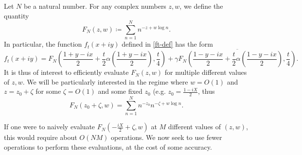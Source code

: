 Let $N$ be a natural number.  For any complex numbers $z,w$, we define the quantity
$$ F_N(z,w) \coloneqq \sum_{n=1}^N  n^{-z + w \log n}.$$
In particular, the function $f_t(x+iy)$ defined in \eqref{ft-def} has the form
$$ f_t(x+iy) = F_N\left( \frac{1+y-ix}{2} + \frac{t}{2} \alpha(\frac{1+y-ix}{2}), \frac{t}{4} \right) + \gamma \overline{F_N\left( \frac{1-y-ix}{2} + \frac{t}{2} \alpha(\frac{1-y-ix}{2}), \frac{t}{4} \right)}.$$
It is thus of interest to efficiently evaluate $F_N(z,w)$ for multiple different values of $z,w$.  We will be particularly interested in the regime where $w=O(1)$ and $z = z_0 + \zeta$ for some $\zeta = O(1)$ and some fixed $z_0$ (e.g. $z_0 = \frac{1-iX}{2}$, thus
$$F_N(z_0+\zeta, w) = \sum_{n=1}^N n^{-z_0} n^{-\zeta + w \log n}.$$

If one were to naively evaluate $F_N(-\frac{iX}{2}+\zeta, w)$ at $M$ different values of $(z,w)$, this would require about $O(NM)$ operations.  We now seek to use fewer operations to perform these evaluations, at the cost of some accuracy.

